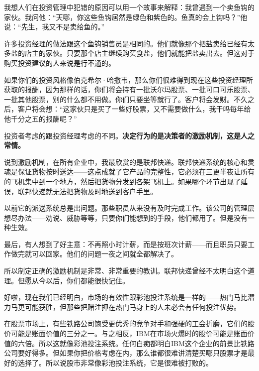 我想人们在投资管理中犯错的原因可以用一个故事来解释：我曾遇到一个卖鱼钩的家伙。我问他：“天哪，你这些鱼钩居然是绿色和紫色的。鱼真的会上钩吗？”他说：“先生，我又不是卖给鱼的。”
\par

许多投资经理的做法跟这个鱼钩销售员是相同的。他们就像那个把盐卖给已经有太多盐的店主的家伙。只要那个店主继续购买食盐，他们就能把盐卖出去。但这对于购买投资建议的人来说是行不通的。
\par

如果你们的投资风格像伯克希尔·哈撒韦，那么你们很难得到现在这些投资经理所获取的报酬，因为那样的话，你们将会持有一批沃尔玛股票、一批可口可乐股票、一批其他股票，别的什么都不用做。你们只要坐等就行了。客户将会发财。不久之后，客户将会想：“这家伙只是买了一些好股票，又不需要做什么，我干吗每年给他千分之五的报酬呢？”
\par

投资者考虑的跟投资经理考虑的不同。\textbf{决定行为的是决策者的激励机制，这是人之常情。}
\par

说到激励机制，在所有企业中，我最欣赏的是联邦快递。联邦快递系统的核心和灵魂是保证货物按时送达——这点成就了它产品的完整性，它必须在三更半夜让所有的飞机集中到一个地方，然后把货物分发到各架飞机上。如果哪个环节出现了延误，联邦快递就无法把货物及时地送到客户手里。
\par

以前它的派送系统总是出问题。那些职员从来没有及时完成工作。该公司的管理层想尽办法——劝说、威胁等等，只要你们能想到的手段，他们都用了。但是没有一种生效。
\par

最后，有人想到了好主意：不再照小时计薪，而是按班次计薪——而且职员只要工作做完就可以回家。他们的问题一夜之间就全都解决了。
\par

所以制定正确的激励机制是非常、非常重要的教训。联邦快递曾经不太明白这个道理。但愿从今以后，你们都能很快记住。
\par

好啦，现在我们已经明白，市场的有效性跟彩池投注系统是一样的——热门马比潜力马更可能获胜，但那些把赌注押在热门马身上的人未必会有任何投注优势。
\par

在股票市场上，有些铁路公司饱受更优秀的竞争对手和强硬的工会折磨，它们的股价可能是账面价值的三分之一。与之相反，IBM在市场火爆时的股价可能是账面价值的六倍。所以这就像彩池投注系统。任何白痴都明白IBM这个企业的前景比铁路公司要好得多。但如果你把价格考虑在内，那么谁都很难讲清楚买哪只股票才是最好的选择了。所以说股市非常像彩池投注系统，它是很难被打败的。
\par

